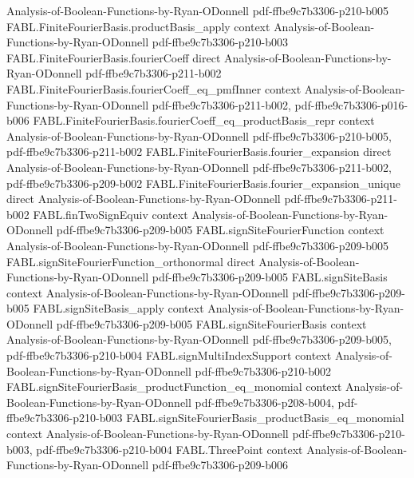\begin{theorem}
  {Analysis-of-Boolean-Functions-by-Ryan-ODonnell}
  {pdf-ffbe9c7b3306-p210-b005}
\proofstep
  {FABL.FiniteFourierBasis.productBasis_apply}
  {context}
  {Analysis-of-Boolean-Functions-by-Ryan-ODonnell}
  {pdf-ffbe9c7b3306-p210-b003}
\proofstep
  {FABL.FiniteFourierBasis.fourierCoeff}
  {direct}
  {Analysis-of-Boolean-Functions-by-Ryan-ODonnell}
  {pdf-ffbe9c7b3306-p211-b002}
\proofstep
  {FABL.FiniteFourierBasis.fourierCoeff_eq_pmfInner}
  {context}
  {Analysis-of-Boolean-Functions-by-Ryan-ODonnell}
  {pdf-ffbe9c7b3306-p211-b002,
    pdf-ffbe9c7b3306-p016-b006}
\proofstep
  {FABL.FiniteFourierBasis.fourierCoeff_eq_productBasis_repr}
  {context}
  {Analysis-of-Boolean-Functions-by-Ryan-ODonnell}
  {pdf-ffbe9c7b3306-p210-b005,
    pdf-ffbe9c7b3306-p211-b002}
\proofstep
  {FABL.FiniteFourierBasis.fourier_expansion}
  {direct}
  {Analysis-of-Boolean-Functions-by-Ryan-ODonnell}
  {pdf-ffbe9c7b3306-p211-b002,
    pdf-ffbe9c7b3306-p209-b002}
\proofstep
  {FABL.FiniteFourierBasis.fourier_expansion_unique}
  {direct}
  {Analysis-of-Boolean-Functions-by-Ryan-ODonnell}
  {pdf-ffbe9c7b3306-p211-b002}
\proofstep
  {FABL.finTwoSignEquiv}
  {context}
  {Analysis-of-Boolean-Functions-by-Ryan-ODonnell}
  {pdf-ffbe9c7b3306-p209-b005}
\proofstep
  {FABL.signSiteFourierFunction}
  {context}
  {Analysis-of-Boolean-Functions-by-Ryan-ODonnell}
  {pdf-ffbe9c7b3306-p209-b005}
\proofstep
  {FABL.signSiteFourierFunction_orthonormal}
  {direct}
  {Analysis-of-Boolean-Functions-by-Ryan-ODonnell}
  {pdf-ffbe9c7b3306-p209-b005}
\proofstep
  {FABL.signSiteBasis}
  {context}
  {Analysis-of-Boolean-Functions-by-Ryan-ODonnell}
  {pdf-ffbe9c7b3306-p209-b005}
\proofstep
  {FABL.signSiteBasis_apply}
  {context}
  {Analysis-of-Boolean-Functions-by-Ryan-ODonnell}
  {pdf-ffbe9c7b3306-p209-b005}
\proofstep
  {FABL.signSiteFourierBasis}
  {context}
  {Analysis-of-Boolean-Functions-by-Ryan-ODonnell}
  {pdf-ffbe9c7b3306-p209-b005,
    pdf-ffbe9c7b3306-p210-b004}
\proofstep
  {FABL.signMultiIndexSupport}
  {context}
  {Analysis-of-Boolean-Functions-by-Ryan-ODonnell}
  {pdf-ffbe9c7b3306-p210-b002}
\proofstep
  {FABL.signSiteFourierBasis_productFunction_eq_monomial}
  {context}
  {Analysis-of-Boolean-Functions-by-Ryan-ODonnell}
  {pdf-ffbe9c7b3306-p208-b004,
    pdf-ffbe9c7b3306-p210-b003}
\proofstep
  {FABL.signSiteFourierBasis_productBasis_eq_monomial}
  {context}
  {Analysis-of-Boolean-Functions-by-Ryan-ODonnell}
  {pdf-ffbe9c7b3306-p210-b003,
    pdf-ffbe9c7b3306-p210-b004}
\proofstep
  {FABL.ThreePoint}
  {context}
  {Analysis-of-Boolean-Functions-by-Ryan-ODonnell}
  {pdf-ffbe9c7b3306-p209-b006}

\end{theorem}
